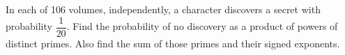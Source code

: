 In each of 106 volumes, independently, a character discovers a secret with probability $\dfrac{1}{20}$. Find the probability of no discovery as a product of powers of distinct primes. Also find the sum of those primes and their signed exponents.
